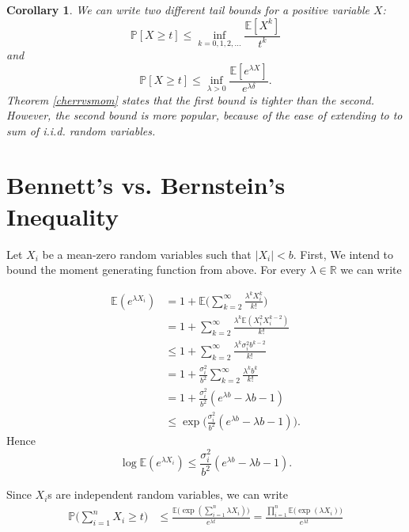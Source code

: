 \documentclass[]{article}
\newtheorem{corollary}[theorem]{Corollary}
\newcommand{\R}{\mathbb{R}}
\newcommand{\E}{\mathbb{E}}
\newcommand{\Prob}{\mathbb{P}}
\begin{document}
\begin{corollary}
We can write two different tail bounds for a positive variable $X$:
\begin{equation}
\Prob[X\geq t] \leq \inf_{k=0, 1, 2, ...}\frac{\mathbb{E}[X^k]}{t^k}
\end{equation}
and 
\begin{equation}
\Prob[X\geq t] \leq \inf_{\lambda>0}\frac{\E[e^{\lambda X}]}{e^{\lambda \delta}}.
\end{equation}
Theorem \eqref{cherrvsmom} states that the first bound is tighter than the second. However, the second bound is more popular, because of the ease of extending to to sum of i.i.d. random variables.
\end{corollary}




\section{Bennett's vs. Bernstein's Inequality}

	Let $X_i$ be a mean-zero random variables such that $|X_i| < b$.  First, We intend to bound the moment generating function from above.  For every $\lambda \in \R$ we can write

\begin{align*}
\E(e^{\lambda X_i}) &= 
1+	\E \Big(\sum_{k = 2}^{\infty}\frac{\lambda^k X_i^k}{k!}\Big)\\
&= 1 + \sum_{k = 2}^{\infty} \frac{\lambda^k \E(X_i^2 X_i^{k-2})}{k!}\\
&\leq 1 + \sum_{k = 2}^{\infty} \frac{\lambda^k \sigma_i^2 b^{k-2}}{k!}\\
&= 1 + \frac{\sigma_i^2}{b^2} \sum_{k = 2}^{\infty} \frac{\lambda^k b^k}{k!}\\
&= 1 + \frac{\sigma_i^2}{b^2} (e^{\lambda b} - \lambda b - 1)\\
&\leq \exp\Big(\frac{\sigma_i^2}{b^2} (e^{\lambda b} - \lambda b - 1)\Big).
\end{align*}
Hence 
\begin{equation}
\label{behrad:2.7.moment}
\log\E(e^{\lambda X_i}) \leq \frac{\sigma_i^2}{b^2} (e^{\lambda b} - \lambda b - 1).
\end{equation}


Since $X_i$s are independent random variables, we can write
\begin{align}{}
\label{behrad:2.7.tail}
\Prob\Big(\sum_{i = 1}^{n} X_i \geq t\Big) &\leq \frac{\E\Big(\exp(\sum_{i = 1}^{n} \lambda X_i)\Big)}{e^{\lambda t}} = \frac{\prod_{i = 1}^{n} \E \Big(\exp(\lambda X_i)\Big)}{e^{\lambda t}}
\end{align}
\end{document}
